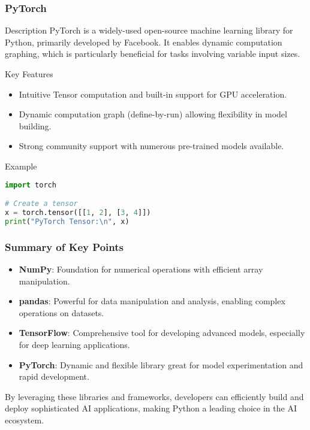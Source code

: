 \documentclass[aspectratio=169]{beamer}
\begin{document}
\begin{frame}[fragile]
    \frametitle{PyTorch}
    \begin{block}{Description}
        PyTorch is a widely-used open-source machine learning library for Python, primarily developed by Facebook. It enables dynamic computation graphing, which is particularly beneficial for tasks involving variable input sizes.
    \end{block}
    \begin{block}{Key Features}
        \begin{itemize}
            \item Intuitive Tensor computation and built-in support for GPU acceleration.
            \item Dynamic computation graph (define-by-run) allowing flexibility in model building.
            \item Strong community support with numerous pre-trained models available.
        \end{itemize}
    \end{block}
    \begin{block}{Example}
        \begin{lstlisting}[language=Python]
import torch

# Create a tensor
x = torch.tensor([[1, 2], [3, 4]])
print("PyTorch Tensor:\n", x)
        \end{lstlisting}
    \end{block}
\end{frame}

\begin{frame}
    \frametitle{Summary of Key Points}
    \begin{itemize}
        \item \textbf{NumPy}: Foundation for numerical operations with efficient array manipulation.
        \item \textbf{pandas}: Powerful for data manipulation and analysis, enabling complex operations on datasets.
        \item \textbf{TensorFlow}: Comprehensive tool for developing advanced models, especially for deep learning applications.
        \item \textbf{PyTorch}: Dynamic and flexible library great for model experimentation and rapid development.
    \end{itemize}
    By leveraging these libraries and frameworks, developers can efficiently build and deploy sophisticated AI applications, making Python a leading choice in the AI ecosystem.
\end{frame}
\end{document}
